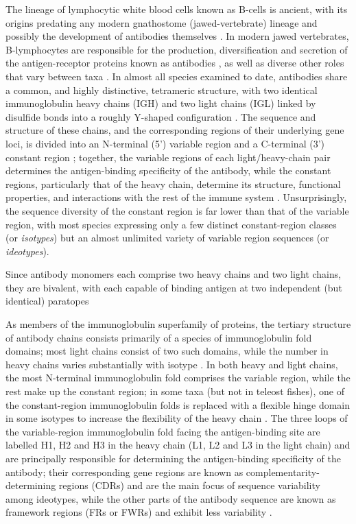 The lineage of lymphocytic white blood cells known as B-cells is ancient, with its origins predating any modern gnathostome (jawed-vertebrate) lineage and possibly the development of antibodies themselves \parencite{boehm2011design,kasahara2015vlr}. In modern jawed vertebrates, B-lymphocytes are responsible for the production, diversification and secretion of the antigen-receptor proteins known as antibodies \parencite{mix2006immunoglobulins,schroeder2010immunoglobulins}, as well as diverse other roles that vary between taxa \parencite{sunyer2013fishing}. In almost all species examined to date, antibodies share a common, and highly distinctive, tetrameric structure, with two identical immunoglobulin heavy chains (IGH) and two light chains (IGL) linked by disulfide bonds into a roughly Y-shaped configuration \parencite{mix2006immunoglobulins,schroeder2010immunoglobulins}. The sequence and structure of these chains, and the corresponding regions of their underlying gene loci, is divided into an N-terminal (5') variable region and a C-terminal (3') constant region \parencite{mix2006immunoglobulins}; together, the variable regions of each light/heavy-chain pair determines the antigen-binding specificity of the antibody, while the constant regions, particularly that of the heavy chain, determine its structure, functional properties, and interactions with the rest of the immune system \parencite{mix2006immunoglobulins,schroeder2010immunoglobulins}. Unsurprisingly, the sequence diversity of the constant region is far lower than that of the variable region, with most species expressing only a few distinct constant-region classes (or \textit{isotypes}) but an almost unlimited variety of variable region sequences (or \textit{ideotypes}).

Since antibody monomers each comprise two heavy chains and two light chains, they are bivalent, with each capable of binding antigen at two independent (but identical) paratopes

As members of the immunoglobulin superfamily of proteins, the tertiary structure of antibody chains consists primarily of a species of immunoglobulin fold domains; most light chains consist of two such domains, while the number in heavy chains varies substantially with isotype \parencite{schroeder2010immunoglobulins}. In both heavy and light chains, the most N-terminal immunoglobulin fold comprises the variable region, while the rest make up the constant region; in some taxa (but not in teleost fishes), one of the constant-region immunoglobulin folds is replaced with a flexible hinge domain in some isotypes to increase the flexibility of the heavy chain \parencite{schroeder2010immunoglobulins}. The three loops of the variable-region immunoglobulin fold facing the antigen-binding site are labelled H1, H2 and H3 in the heavy chain (L1, L2 and L3 in the light chain) and are principally responsible for determining the antigen-binding specificity of the antibody; their corresponding gene regions are known as complementarity-determining regions (CDRs) and are the main focus of sequence variability among ideotypes, while the other parts of the antibody sequence are known as framework regions (FRs or FWRs) and exhibit less variability \parencite{schroeder2010immunoglobulins}.

